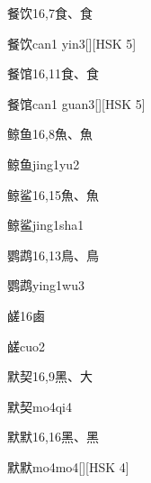 \begin{entry}{餐饮}{16,7}{⾷、⾷}
  \begin{phonetics}{餐饮}{can1 yin3}[][HSK 5]
  \end{phonetics}
\end{entry}

\begin{entry}{餐馆}{16,11}{⾷、⾷}
  \begin{phonetics}{餐馆}{can1 guan3}[][HSK 5]
  \end{phonetics}
\end{entry}

\begin{entry}{鲸鱼}{16,8}{⿂、⿂}
  \begin{phonetics}{鲸鱼}{jing1yu2}
  \end{phonetics}
\end{entry}

\begin{entry}{鲸鲨}{16,15}{⿂、⿂}
  \begin{phonetics}{鲸鲨}{jing1sha1}
  \end{phonetics}
\end{entry}

\begin{entry}{鹦鹉}{16,13}{⿃、⿃}
  \begin{phonetics}{鹦鹉}{ying1wu3}
  \end{phonetics}
\end{entry}

\begin{entry}{鹾}{16}{⿄}
  \begin{phonetics}{鹾}{cuo2}
  \end{phonetics}
\end{entry}

\begin{entry}{默契}{16,9}{⿊、⼤}
  \begin{phonetics}{默契}{mo4qi4}
  \end{phonetics}
\end{entry}

\begin{entry}{默默}{16,16}{⿊、⿊}
  \begin{phonetics}{默默}{mo4mo4}[][HSK 4]
  \end{phonetics}
\end{entry}


